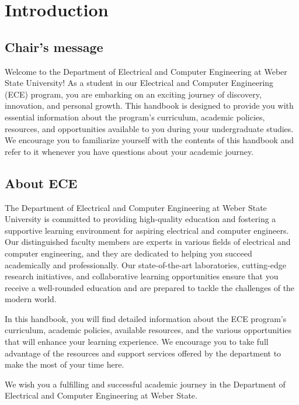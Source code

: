 \chapter{Introduction}
\label{cha:introduction}

\section{Chair's message}
\label{sec:chairs-message}

Welcome to the Department of Electrical and Computer Engineering at Weber State University! As a student in our Electrical and Computer Engineering (ECE) program, you are embarking on an exciting journey of discovery, innovation, and personal growth. This handbook is designed to provide you with essential information about the program’s curriculum, academic policies, resources, and opportunities available to you during your undergraduate studies. We encourage you to familiarize yourself with the contents of this handbook and refer to it whenever you have questions about your academic journey.

\section{About ECE}
\label{sec:about-departm-electr}

The Department of Electrical and Computer Engineering at Weber State University is committed to providing high-quality education and fostering a supportive learning environment for aspiring electrical and computer engineers. Our distinguished faculty members are experts in various fields of electrical and computer engineering, and they are dedicated to helping you succeed academically and professionally. Our state-of-the-art laboratories, cutting-edge research initiatives, and collaborative learning opportunities ensure that you receive a well-rounded education and are prepared to tackle the challenges of the modern world.

In this handbook, you will find detailed information about the ECE program's curriculum, academic policies, available resources, and the various opportunities that will enhance your learning experience. We encourage you to take full advantage of the resources and support services offered by the department to make the most of your time here.

We wish you a fulfilling and successful academic journey in the Department of Electrical and Computer Engineering at Weber State.

